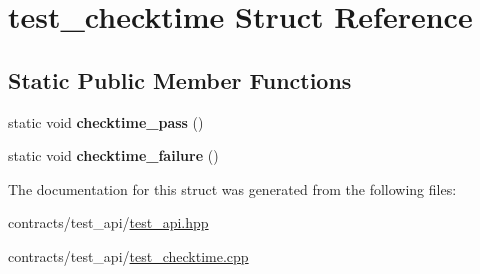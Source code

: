 \hypertarget{structtest__checktime}{}\section{test\+\_\+checktime Struct Reference}
\label{structtest__checktime}
\subsection*{Static Public Member Functions}
\begin{DoxyCompactItemize}
\item 
\mbox{\label{structtest__checktime_a802bc87b77666f6ebf403146672cc379}} 
static void {\bfseries checktime\+\_\+pass} ()
\item 
\mbox{\label{structtest__checktime_a32d0da9944911ce3e825b686ec81b1a8}} 
static void {\bfseries checktime\+\_\+failure} ()
\end{DoxyCompactItemize}


The documentation for this struct was generated from the following files\+:\begin{DoxyCompactItemize}
\item 
contracts/test\+\_\+api/\mbox{\hyperlink{test__api_8hpp}{test\+\_\+api.\+hpp}}\item 
contracts/test\+\_\+api/\mbox{\hyperlink{test__checktime_8cpp}{test\+\_\+checktime.\+cpp}}\end{DoxyCompactItemize}
